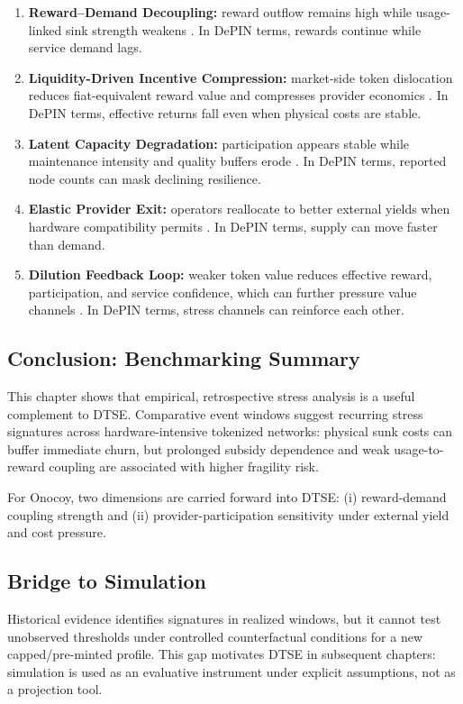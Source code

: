 \begin{enumerate}
    \item \textbf{Reward--Demand Decoupling:} reward outflow remains high while usage-linked sink strength weakens \cite{FrontiersDePIN2025, OnocoyRewards}. In DePIN terms, rewards continue while service demand lags.
    \item \textbf{Liquidity-Driven Incentive Compression:} market-side token dislocation reduces fiat-equivalent reward value and compresses provider economics \cite{Ho2022, Lin2024}. In DePIN terms, effective returns fall even when physical costs are stable.
    \item \textbf{Latent Capacity Degradation:} participation appears stable while maintenance intensity and quality buffers erode \cite{Arthur1989, Ballandies2023}. In DePIN terms, reported node counts can mask declining resilience.
    \item \textbf{Elastic Provider Exit:} operators reallocate to better external yields when hardware compatibility permits \cite{Chiu2024, Lin2024, GeodnetLocationNFT}. In DePIN terms, supply can move faster than demand.
    \item \textbf{Dilution Feedback Loop:} weaker token value reduces effective reward, participation, and service confidence, which can further pressure value channels \cite{Lin2024, FrontiersDePIN2025}. In DePIN terms, stress channels can reinforce each other.
\end{enumerate}

\subsection{Conclusion: Benchmarking Summary}
This chapter shows that empirical, retrospective stress analysis is a useful complement to DTSE. Comparative event windows suggest recurring stress signatures across hardware-intensive tokenized networks: physical sunk costs can buffer immediate churn, but prolonged subsidy dependence and weak usage-to-reward coupling are associated with higher fragility risk.

For Onocoy, two dimensions are carried forward into DTSE: (i) reward-demand coupling strength and (ii) provider-participation sensitivity under external yield and cost pressure.

\subsection{Bridge to Simulation}
Historical evidence identifies signatures in realized windows, but it cannot test unobserved thresholds under controlled counterfactual conditions for a new capped/pre-minted profile. This gap motivates DTSE in subsequent chapters: simulation is used as an evaluative instrument under explicit assumptions, not as a projection tool.
